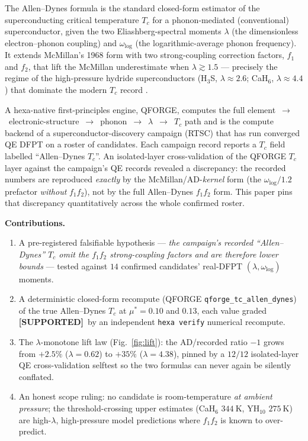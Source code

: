 \documentclass[11pt,a4paper]{article}
\providecommand{\tierGreen}{\textcolor{green!50!black}{\textbf{[SUPPORTED]}}}
\begin{document}
The Allen--Dynes formula \citep{allendynes1975} is the standard closed-form
estimator of the superconducting critical temperature $T_c$ for a
phonon-mediated (conventional) superconductor, given the two
Eliashberg-spectral moments $\lambda$ (the dimensionless electron--phonon
coupling) and $\omega_{\log}$ (the logarithmic-average phonon frequency). It
extends McMillan's 1968 form \citep{mcmillan1968} with two strong-coupling
correction factors, $f_1$ and $f_2$, that lift the McMillan underestimate when
$\lambda \gtrsim 1.5$ --- precisely the regime of the high-pressure hydride
superconductors (H$_3$S, $\lambda \approx 2.6$; CaH$_6$, $\lambda \approx 4.4$)
that dominate the modern $T_c$ record \citep{drozdov2015,ma2022cah6}.

A hexa-native first-principles engine, QFORGE, computes the full
element~$\to$~electronic-structure~$\to$~phonon~$\to$~$\lambda$~$\to$~$T_c$
path and is the compute backend of a superconductor-discovery campaign (RTSC)
that has run converged QE DFPT on a roster of candidates. Each campaign record
reports a $T_c$ field labelled ``Allen--Dynes $T_c$''. An isolated-layer
cross-validation of the QFORGE $T_c$ layer against the campaign's QE records
revealed a discrepancy: the recorded numbers are reproduced \emph{exactly} by
the McMillan/AD-\emph{kernel} form (the $\omega_{\log}/1.2$ prefactor
\emph{without} $f_1 f_2$), not by the full Allen--Dynes $f_1 f_2$ form. This
paper pins that discrepancy quantitatively across the whole confirmed roster.

\medskip
\noindent\textbf{Contributions.}
\begin{enumerate}\itemsep0.3em
\item A pre-registered falsifiable hypothesis --- \emph{the campaign's recorded
  ``Allen--Dynes'' $T_c$ omit the $f_1 f_2$ strong-coupling factors and are
  therefore lower bounds} --- tested against $14$ confirmed candidates'
  real-DFPT $(\lambda,\omega_{\log})$ moments.
\item A deterministic closed-form recompute (QFORGE
  \texttt{qforge\_tc\_allen\_dynes}) of the true Allen--Dynes $T_c$ at
  $\mu^*=0.10$ and $0.13$, each value graded \tierGreen\ by an independent
  \texttt{hexa verify} numerical recompute.
\item The $\lambda$-monotone lift law (Fig.~\ref{fig:lift}): the AD/recorded
  ratio $-1$ grows from $+2.5\%$ ($\lambda{=}0.62$) to $+35\%$
  ($\lambda{=}4.38$), pinned by a $12/12$ isolated-layer QE cross-validation
  selftest so the two formulas can never again be silently conflated.
\item An honest scope ruling: no candidate is room-temperature \emph{at ambient
  pressure}; the threshold-crossing upper estimates (CaH$_6$
  $\SI{344}{\kelvin}$, YH$_{10}$ $\SI{275}{\kelvin}$) are high-$\lambda$,
  high-pressure model predictions where $f_1 f_2$ is known to over-predict.
\end{enumerate}
\end{document}
